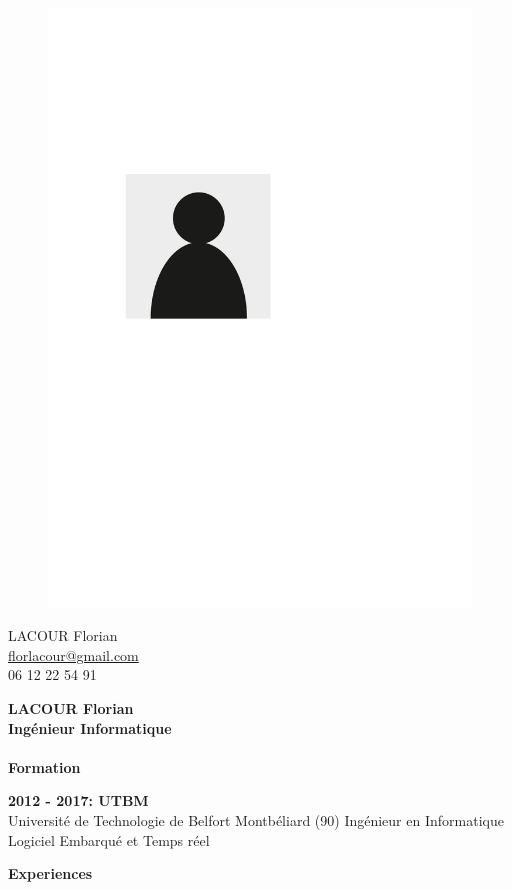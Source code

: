 \documentclass[a4paper,11pt,final]{memoir}
\newcommand{\CVSection}[1]
	{\Large\textbf{#1}\par
	\normalsize\normalfont}
\newcommand{\CVItem}[1]
	{\textbf{\color{RoyalBlue} #1}}
\begin{document}
\begin{figure}
	\hfill
	\includegraphics[width=0.6\columnwidth]{photo}
	\vspace{-7cm}
\end{figure}

\begin{flushright}\small
	LACOUR Florian \\
	\url{florlacour@gmail.com}  \\
	06 12 22 54 91
\end{flushright}\normalsize
\framebreak


\Huge\bfseries {\color{RoyalBlue}  LACOUR Florian} \\
\Large\bfseries  Ingénieur Informatique \\ \\
\CVSection{Formation}
\CVItem{2012  - 2017: UTBM }\\
Université de Technologie de Belfort Montbéliard (90) Ingénieur en Informatique Logiciel Embarqué et Temps réel 

\CVSection{Experiences}
\end{document}
